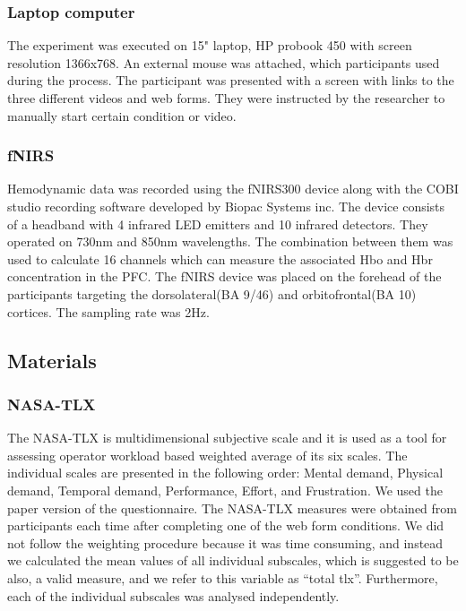 \documentclass[a4paper]{report}
\begin{document}
			\subsubsection{Laptop computer}
			The experiment was executed on 15" laptop, HP probook 450 with screen resolution 1366x768. An external mouse was attached, which participants used during the process. The participant was presented with a screen with links to the three different videos and web forms. They were instructed by the researcher to manually start certain condition or video. 
			\subsubsection{fNIRS}
			Hemodynamic data was recorded using the fNIRS300 device along with the COBI studio recording software developed by Biopac Systems inc. The device consists of a headband with 4 infrared LED emitters and 10 infrared detectors. They operated on 730nm and 850nm wavelengths. The combination between them was used to calculate 16 channels which can measure the associated Hbo and Hbr concentration in the PFC. The fNIRS device was placed on the forehead of the participants targeting the dorsolateral(BA 9/46) and orbitofrontal(BA 10) cortices. The sampling rate was 2Hz.
			
        \subsection{Materials}
			\subsubsection{NASA-TLX}
			The NASA-TLX\cite{nasatlx} is multidimensional subjective scale and it is used as a tool for assessing operator workload based weighted average of its six scales. The individual scales are presented in the following order: Mental demand, Physical demand, Temporal demand, Performance, Effort, and Frustration. We used the paper version of the questionnaire. The NASA-TLX measures were obtained from participants each time after completing one of the web form conditions. We did not follow the weighting procedure because it was time consuming, and instead we calculated the mean values of all individual subscales, which is suggested to be also, a valid measure\cite{hart2006nasa}, and we refer to this variable as ``total tlx''. Furthermore, each of the individual subscales was analysed independently.
\end{document}
